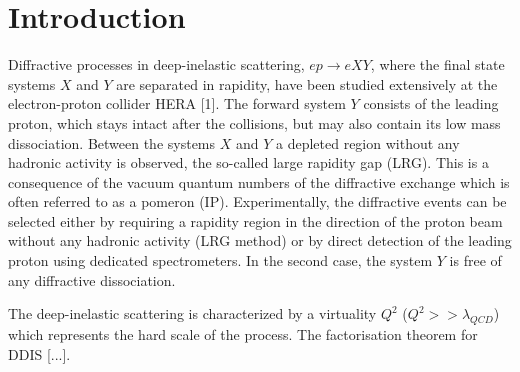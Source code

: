 \documentclass[12pt]{article}
\begin{document}





\clearpage

\pagestyle{plain} %


\section{Introduction}

Diffractive processes in deep-inelastic scattering, $ep \to eXY$, where the final state systems $X$ and $Y$ are separated in rapidity, have been studied extensively at the electron-proton collider HERA [1].
%
The forward system $Y$ consists of the leading proton, which stays intact after the collisions, but may also contain its low mass dissociation.
%
Between the systems $X$ and $Y$ a depleted region without any hadronic activity is observed, the so-called large rapidity gap
(LRG).
%
This is a consequence of the vacuum quantum numbers of the diffractive exchange which is often referred to as a pomeron (IP).
%
Experimentally, the diffractive events can be selected either by requiring a rapidity region in the direction of the proton beam without any hadronic activity (LRG method) or by direct detection of the leading proton using dedicated spectrometers.
%
In the second case, the system $Y$ is free of any diffractive dissociation.

The deep-inelastic scattering is characterized by a virtuality $Q^2$ ($Q^2 >> \lambda_{QCD}$) which represents the hard scale of the process.
The factorisation theorem for DDIS \cite{Collins:1997sr} [...].




\end{document}
